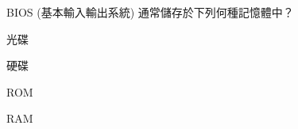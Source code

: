 \ifx\ntpcNinetyTwo\undefined[92學年基北區] \fi
BIOS (基本輸入輸出系統) 通常儲存於下列何種記憶體中？
  \begin{optionlist}
  \item 光碟
  \item 硬碟
  \item ROM\label{ntpc-92-a34}
  \item RAM
  \end{optionlist}